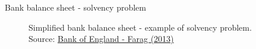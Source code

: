\begin{frame}{Bank balance sheet - solvency problem}

\begin{figure}
\begin{center}


\caption{\label{fig:L4_bank_bs_solvency_problem} Simplified bank balance sheet - example of solvency problem. Source: \href{https://www.bankofengland.co.uk/-/media/boe/files/quarterly-bulletin/2013/bank-capital-and-liquidity.pdf}{Bank of England - Farag (2013)}}

\end{center}
\end{figure}

\end{frame}



